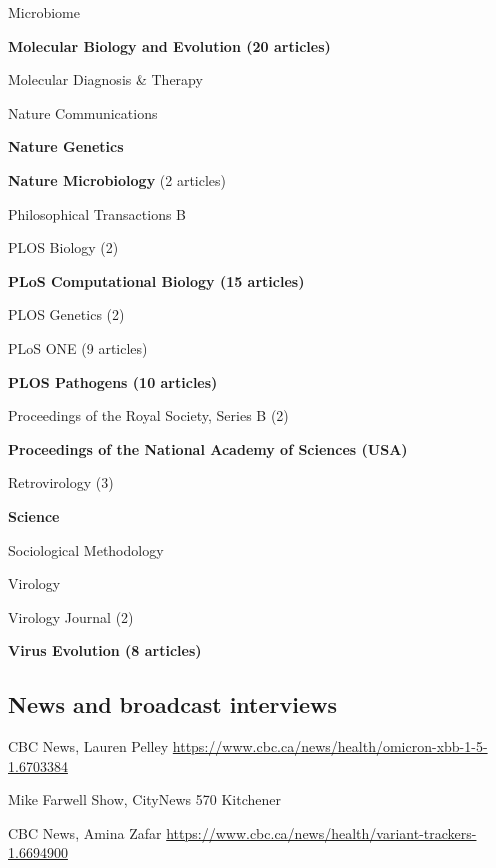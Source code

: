 {\begin{cvitemize}
\item Microbiome
\item \textbf{Molecular Biology and Evolution  (20 articles)}
\item Molecular Diagnosis \& Therapy
\item Nature Communications
\item \textbf{Nature Genetics}
\item \textbf{Nature Microbiology} (2 articles)
\item Philosophical Transactions B
\item PLOS Biology         (2)                         
\item \textbf{PLoS Computational Biology     (15 articles)}
\item PLOS Genetics (2)
\item PLoS ONE   (9 articles)
\item \textbf{PLOS Pathogens   (10 articles)}
\item Proceedings of the Royal Society, Series B    (2)
\item \textbf{Proceedings of the National Academy of Sciences (USA)}
\item Retrovirology                                 (3)
\item \textbf{Science} 
\item Sociological Methodology                      
\item Virology                                      
\item Virology Journal                              (2)
\item \textbf{Virus Evolution           (8 articles)}
\end{cvitemize}
}


\subsection {News and broadcast interviews}

{CBC News, Lauren Pelley}
{\url{https://www.cbc.ca/news/health/omicron-xbb-1-5-1.6703384}}
{}{}

{Mike Farwell Show, CityNews 570 Kitchener}
{}
{}{}


{CBC News, Amina Zafar}
{\url{https://www.cbc.ca/news/health/variant-trackers-1.6694900}}
{}{}

